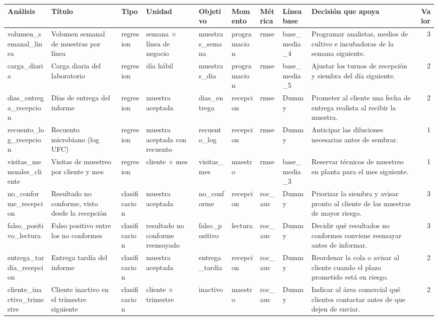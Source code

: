 \begin{tabular}{lllllllllr}
\toprule
Análisis & Título & Tipo & Unidad & Objetivo & Momento & Métrica & Línea base & Decisión que apoya & Valor \\
\midrule
volumen\_semanal\_linea & Volumen semanal de muestras por línea & regresion & semana $\times$ línea de negocio & muestras\_semana & programacion & rmse & base\_media\_4 & Programar analistas, medios de cultivo e incubadoras de la semana siguiente. & 3 \\
carga\_diaria & Carga diaria del laboratorio & regresion & día hábil & muestras\_dia & programacion & rmse & base\_media\_5 & Ajustar los turnos de recepción y siembra del día siguiente. & 2 \\
dias\_entrega\_recepcion & Días de entrega del informe & regresion & muestra aceptada & dias\_entrega & recepcion & rmse & Dummy & Prometer al cliente una fecha de entrega realista al recibir la muestra. & 2 \\
recuento\_log\_recepcion & Recuento microbiano (log UFC) & regresion & muestra aceptada con recuento & recuento\_log & recepcion & rmse & Dummy & Anticipar las diluciones necesarias antes de sembrar. & 1 \\
visitas\_mensuales\_cliente & Visitas de muestreo por cliente y mes & regresion & cliente $\times$ mes & visitas\_mes & maestro & rmse & base\_media\_3 & Reservar técnicos de muestreo en planta para el mes siguiente. & 1 \\
no\_conforme\_recepcion & Resultado no conforme, visto desde la recepción & clasificacion & muestra aceptada & no\_conforme & recepcion & roc\_auc & Dummy & Priorizar la siembra y avisar pronto al cliente de las muestras de mayor riesgo. & 3 \\
falso\_positivo\_lectura & Falso positivo entre los no conformes & clasificacion & resultado no conforme reensayado & falso\_positivo & lectura & roc\_auc & Dummy & Decidir qué resultados no conformes conviene reensayar antes de informar. & 3 \\
entrega\_tardia\_recepcion & Entrega tardía del informe & clasificacion & muestra aceptada & entrega\_tardia & recepcion & roc\_auc & Dummy & Reordenar la cola o avisar al cliente cuando el plazo prometido está en riesgo. & 2 \\
cliente\_inactivo\_trimestre & Cliente inactivo en el trimestre siguiente & clasificacion & cliente $\times$ trimestre & inactivo & maestro & roc\_auc & Dummy & Indicar al área comercial qué clientes contactar antes de que dejen de enviar. & 2 \\

\end{tabular}

